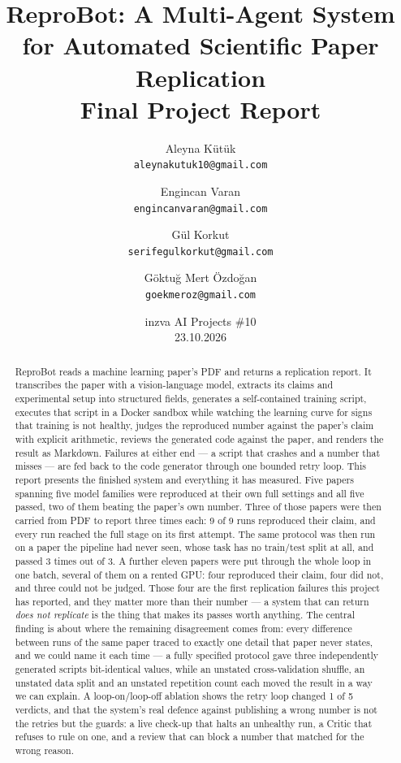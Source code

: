 \documentclass[11pt]{article}
\title{\textbf{ReproBot: A Multi-Agent System for Automated Scientific Paper Replication}\\[0.4em]
\large Final Project Report}
\author{
  Aleyna Kütük \\ \small\texttt{aleynakutuk10@gmail.com}
  \and
  Engincan Varan \\ \small\texttt{engincanvaran@gmail.com}
  \and
  Gül Korkut \\ \small\texttt{serifegulkorkut@gmail.com}
  \and
  Göktuğ Mert Özdoğan \\ \small\texttt{goekmeroz@gmail.com}
}
\date{inzva AI Projects \#10 \\ 23.10.2026}
\begin{document}
\maketitle

\begin{abstract}
ReproBot reads a machine learning paper's PDF and returns a replication report. It transcribes
the paper with a vision-language model, extracts its claims and experimental setup into
structured fields, generates a self-contained training script, executes that script in a Docker
sandbox while watching the learning curve for signs that training is not healthy, judges the
reproduced number against the paper's claim with explicit arithmetic, reviews the generated code
against the paper, and renders the result as Markdown. Failures at either end --- a script that
crashes and a number that misses --- are fed back to the code generator through one bounded
retry loop. This report presents the finished system and everything it has measured. Five papers
spanning five model families were reproduced at their own full settings and all five passed,
two of them beating the paper's own number. Three of those papers were then carried from PDF to
report three times each: 9 of 9 runs reproduced their claim, and every run reached the full stage
on its first attempt. The same protocol was then run on a paper the pipeline had never seen,
whose task has no train/test split at all, and passed 3 times out of 3. A further eleven papers
were put through the whole loop in one batch, several of them on a rented GPU: four reproduced
their claim, four did not, and three could not be judged. Those four are the first replication
failures this project has reported, and they matter more than their number --- a system that can
return \emph{does not replicate} is the thing that makes its passes worth anything. The central
finding is about where the remaining disagreement comes from: every difference between runs of
the same paper traced to exactly one detail that paper never states, and we could name it each
time --- a fully specified protocol gave three independently generated scripts bit-identical
values, while an unstated cross-validation shuffle, an unstated data split and an unstated
repetition count each moved the result in a way we can explain. A loop-on/loop-off ablation
shows the retry loop changed 1 of 5 verdicts, and that the system's real defence against
publishing a wrong number is not the retries but the guards: a live check-up that halts an
unhealthy run, a Critic that refuses to rule on one, and a review that can block a number that
matched for the wrong reason.
\end{abstract}
\end{document}
